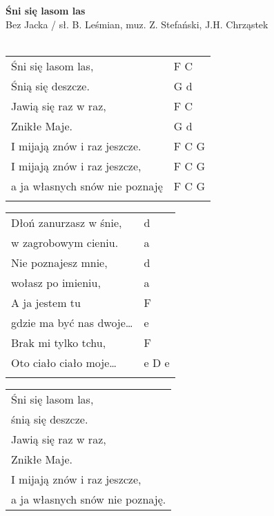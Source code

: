 \documentclass[a5paper]{article}
\begin{document}


\noindent
\fontsize{12pt}{15pt}\selectfont
\textbf{Śni się lasom las} \\
\fontsize{8pt}{10pt}\selectfont
Bez Jacka / sł. B. Leśmian, muz. Z. Stefański, J.H. Chrząstek \\ \\
\fontsize{10pt}{12pt}\selectfont
{}
\begin{tabular}{@{}p{7.50cm}p{3cm}@{}}
\noindent
Śni się lasom las, & F C \\
Śnią się deszcze. & G d \\
Jawią się raz w raz, & F C \\
Znikłe Maje. & G d \\
I mijają znów i raz jeszcze. & F C G \\
I mijają znów i raz jeszcze, & F C G \\
a ja własnych snów nie poznaję & F C G \\ \\
\end{tabular}

\noindent
\begin{tabular}{@{}p{7.50cm}p{3cm}@{}}
Dłoń zanurzasz w śnie, & d \\
w zagrobowym cieniu. & a \\
Nie poznajesz mnie, & d \\
wołasz po imieniu, & a \\
A ja jestem tu & F \\
gdzie ma być nas dwoje… & e \\
Brak mi tylko tchu, & F \\
Oto ciało ciało moje… & e D e \\ \\
\end{tabular}

\noindent
\begin{tabular}{@{}p{7.50cm}@{}}
Śni się lasom las, \\
śnią się deszcze. \\
Jawią się raz w raz, \\
Znikłe Maje. \\
I mijają znów i raz jeszcze, \\
a ja własnych snów nie poznaję.
\end{tabular}
\end{document}
